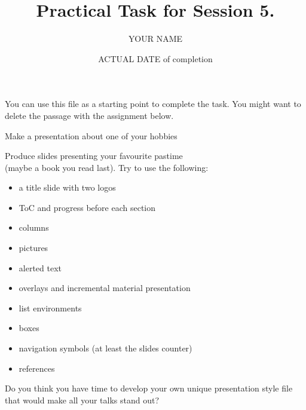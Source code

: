 \documentclass[11pt]{beamer}
\title{Practical Task for Session 5.}
\author{YOUR NAME}
\date{ACTUAL DATE of completion}
\begin{document}
	
	\begin{frame}{}
		
		\maketitle
		
	\end{frame}

	\begin{frame}[plain]{}
	
	You can use this file as a starting point to complete the task. You might want to delete the passage with the assignment below.
	
 	\end{frame}
 
	\begin{frame}{Make a presentation about one of your hobbies}
		
		Produce slides presenting your favourite pastime \\(maybe a book you read last). Try to use the following:
		
		
		\begin{itemize}
			\item a title slide with two logos
			\item ToC and progress before each section
			\item columns
			\item pictures
			\item alerted text
			\item overlays and incremental material presentation
			\item list environments
			\item boxes
			\item navigation symbols (at least the slides counter)
			\item references
		\end{itemize}
		Do you think you have time to develop your own unique presentation style file that would make all your talks stand out? 
		
	\end{frame}


	
\end{document}
